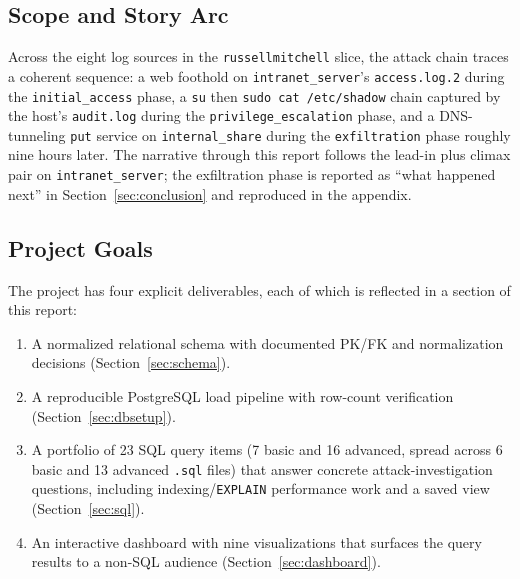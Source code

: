 \subsection{Scope and Story Arc}
Across the eight log sources in the \texttt{russellmitchell} slice, the
attack chain traces a coherent sequence: a web foothold on
\texttt{intranet\_server}'s \texttt{access.log.2} during the
\texttt{initial\_access} phase, a \texttt{su} then
\texttt{sudo cat /etc/shadow} chain captured by the host's
\texttt{audit.log} during the \texttt{privilege\_escalation} phase,
and a DNS-tunneling \texttt{put} service on \texttt{internal\_share}
during the \texttt{exfiltration} phase roughly nine hours later. The
narrative through this report follows the lead-in plus climax pair on
\texttt{intranet\_server}; the exfiltration phase is reported as
``what happened next'' in Section~\ref{sec:conclusion} and reproduced
in the appendix.

\subsection{Project Goals}
The project has four explicit deliverables, each of which is reflected
in a section of this report:
\begin{enumerate}
  \item A normalized relational schema with documented PK/FK and
    normalization decisions (Section~\ref{sec:schema}).
  \item A reproducible PostgreSQL load pipeline with row-count
    verification (Section~\ref{sec:dbsetup}).
  \item A portfolio of 23 SQL query items (7 basic and 16 advanced,
    spread across 6 basic and 13 advanced \texttt{.sql} files) that
    answer concrete attack-investigation questions, including
    indexing/\texttt{EXPLAIN} performance work and a saved view
    (Section~\ref{sec:sql}).
  \item An interactive dashboard with nine visualizations that
    surfaces the query results to a non-SQL audience
    (Section~\ref{sec:dashboard}).
\end{enumerate}
